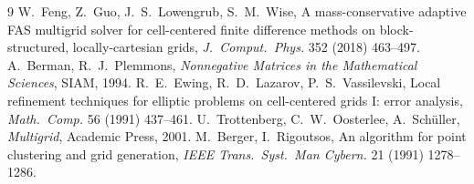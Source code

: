 \documentclass[11pt]{article}
\theoremstyle{remark}
\begin{document}
\begin{thebibliography}{9}
 W.~Feng, Z.~Guo, J.~S.~Lowengrub, S.~M.~Wise,
A mass-conservative adaptive FAS multigrid solver for cell-centered
finite difference methods on block-structured, locally-cartesian grids,
\emph{J.~Comput.~Phys.} 352 (2018) 463--497.
 A.~Berman, R.~J.~Plemmons,
\emph{Nonnegative Matrices in the Mathematical Sciences}, SIAM, 1994.
 R.~E.~Ewing, R.~D.~Lazarov, P.~S.~Vassilevski,
Local refinement techniques for elliptic problems on cell-centered
grids I: error analysis, \emph{Math.~Comp.} 56 (1991) 437--461.
 U.~Trottenberg, C.~W.~Oosterlee, A.~Sch\"uller,
\emph{Multigrid}, Academic Press, 2001.
 M.~Berger, I.~Rigoutsos, An algorithm for
point clustering and grid generation, \emph{IEEE Trans.\ Syst.\ Man
Cybern.} 21 (1991) 1278--1286.
\end{thebibliography}
\end{document}
